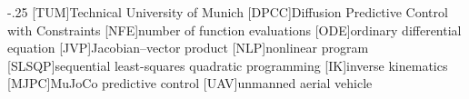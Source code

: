
\begin{acronym}
  \itemsep-.25\baselineskip
  [TUM]{Technical University of Munich}
  [DPCC]{Diffusion Predictive Control with Constraints}
  [NFE]{number of function evaluations}
  [ODE]{ordinary differential equation}
  [JVP]{Jacobian--vector product}
  [NLP]{nonlinear program}
  [SLSQP]{sequential least-squares quadratic programming}
  [IK]{inverse kinematics}
  [MJPC]{MuJoCo predictive control}
  [UAV]{unmanned aerial vehicle}
\end{acronym}

\listoffigures{}
\listoftables{}

\printbibliography{}

